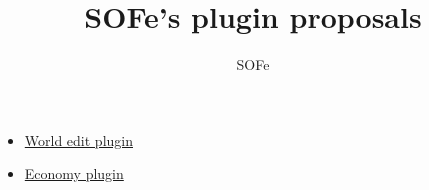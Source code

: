 \documentclass{article}
\title{SOFe's plugin proposals}
\author{SOFe}
\begin{document}
	\maketitle
	\begin{itemize}
		\item \href{world-edit}{World edit plugin}
		\item \href{economy}{Economy plugin}
	\end{itemize}
\end{document}
